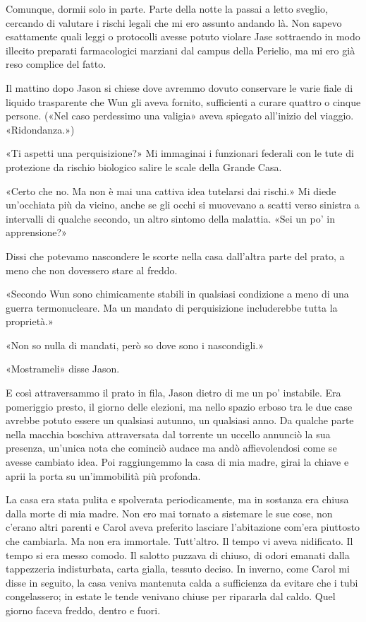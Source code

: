 Comunque, dormii solo in parte. Parte della notte la passai a letto
sveglio, cercando di valutare i rischi legali che mi ero assunto andando
là. Non sapevo esattamente quali leggi o protocolli avesse potuto
violare Jase sottraendo in modo illecito preparati farmacologici
marziani dal campus della Perielio, ma mi ero già reso complice del
fatto.

Il mattino dopo Jason si chiese dove avremmo dovuto conservare le varie
fiale di liquido trasparente che Wun gli aveva fornito, sufficienti a
curare quattro o cinque persone. («Nel caso perdessimo una valigia»
aveva spiegato all'inizio del viaggio. «Ridondanza.»)

«Ti aspetti una perquisizione?» Mi immaginai i funzionari federali con
le tute di protezione da rischio biologico salire le scale della Grande
Casa.

«Certo che no. Ma non è mai una cattiva idea tutelarsi dai rischi.» Mi
diede un'occhiata più da vicino, anche se gli occhi si muovevano a
scatti verso sinistra a intervalli di qualche secondo, un altro sintomo
della malattia. «Sei un po' in apprensione?»

Dissi che potevamo nascondere le scorte nella casa dall'altra parte del
prato, a meno che non dovessero stare al freddo.

«Secondo Wun sono chimicamente stabili in qualsiasi condizione a meno di
una guerra termonucleare. Ma un mandato di perquisizione includerebbe
tutta la proprietà.»

«Non so nulla di mandati, però so dove sono i nascondigli.»

«Mostrameli» disse Jason.

E così attraversammo il prato in fila, Jason dietro di me un po'
instabile. Era pomeriggio presto, il giorno delle elezioni, ma nello
spazio erboso tra le due case avrebbe potuto essere un qualsiasi
autunno, un qualsiasi anno. Da qualche parte nella macchia boschiva
attraversata dal torrente un uccello annunciò la sua presenza, un'unica
nota che cominciò audace ma andò affievolendosi come se avesse cambiato
idea. Poi raggiungemmo la casa di mia madre, girai la chiave e aprii la
porta su un'immobilità più profonda.

La casa era stata pulita e spolverata periodicamente, ma in sostanza era
chiusa dalla morte di mia madre. Non ero mai tornato a sistemare le sue
cose, non c'erano altri parenti e Carol aveva preferito lasciare
l'abitazione com'era piuttosto che cambiarla. Ma non era immortale.
Tutt'altro. Il tempo vi aveva nidificato. Il tempo si era messo comodo.
Il salotto puzzava di chiuso, di odori emanati dalla tappezzeria
indisturbata, carta gialla, tessuto deciso. In inverno, come Carol mi
disse in seguito, la casa veniva mantenuta calda a sufficienza da
evitare che i tubi congelassero; in estate le tende venivano chiuse per
ripararla dal caldo. Quel giorno faceva freddo, dentro e fuori.

